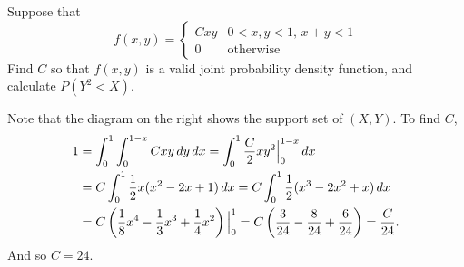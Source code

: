 \documentclass[notoc,notitlepage]{tufte-book}
\begin{document}
\begin{eg}[Example 3.10]
  Suppose that
  \begin{equation*}
    f(x, y) = \begin{cases}
      Cxy & 0 < x, y < 1, \, x + y < 1 \\
      0   & \text{otherwise}
    \end{cases}
  \end{equation*}
  Find $C$ so that $f(x, y)$ is a valid joint probability density function, and calculate $P(Y^2 < X)$.
\end{eg}

\begin{solution}
  Note that the diagram on the right shows the support set of $(X, Y)$. To find $C$,
  \begin{align*}
    1 &= \int_{0}^{1} \int_{0}^{1 - x} Cxy \mathop{}\!d{y} \mathop{}\!d{x} = \int_{0}^{1} \frac{C}{2}xy^2 \Big|_{0}^{1 - x} \mathop{}\!d{x} \\
      &= C \int_{0}^{1} \frac{1}{2} x (x^2 - 2x + 1) \mathop{}\!d{x} = C \int_{0}^{1} \frac{1}{2} ( x^3 - 2x^2 + x ) \mathop{}\!d{x} \\
      &= C \left( \frac{1}{8} x^4 - \frac{1}{3} x^3 + \frac{1}{4} x^2 \right) \Big|_{0}^{1} = C \left( \frac{3}{24} - \frac{8}{24} + \frac{6}{24} \right) = \frac{C}{24}.
  \end{align*}
  And so $C = 24$.
  \pagebreak


\end{solution}
\end{document}
